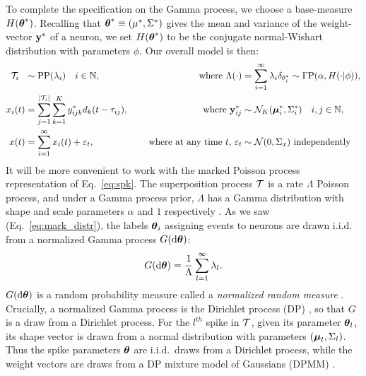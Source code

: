 To complete the specification on the Gamma process, we choose a base-measure $H(\boldsymbol{\theta}^*)$.
Recalling that $\boldsymbol{\theta}^* \equiv (\mu^*, \Sigma^*)$ gives the mean and variance of the weight-vector $\mathbf{y}^*$ of a neuron, we set $H(\boldsymbol{\theta}^*)$ 
to be the conjugate normal-Wishart distribution with parameters $\phi$. Our overall model is then:
\begin{subequations}
\begin{align}
  \mc{T}_i\ \  &\sim \text{PP}(\lambda_i) \quad i \in \NN, \quad &\text{ where } \Lambda(\cdot)&=\sum_{i=1}^{\infty} \lambda_i \delta_{\theta^*_i} \sim \Gamma \text{P}(\alpha, H(\cdot| {\phi})), \\ %
  x_i(t) &= \sum_{j = 1}^{|\mc{T}_i|}  \sum_{k = 1}^{K} y^*_{ijk} d_k(t - \tau_{ij}), \quad &\text{ where }\by^*_{ij}  &\sim \mc{N}_K(\mb{\mu}^*_i, \Sigma^*_i) \quad i,j \in \NN, \\
  x(t)   &= \sum_{i=1}^{\infty} x_i(t) + \eps_t, \quad &\text{ where at any time $t$, } \eps_t &\sim \mc{N}(0,\Sigma_x) \text{ independently}
\end{align}
\end{subequations}
% 
It will be more convenient to work with the marked Poisson process representation of Eq.~\eqref{eq:spk}. %
The superposition process $\mathcal{T}$ is a rate $\Lambda$ Poisson process,
and under a Gamma process prior, $\Lambda$ has a Gamma distribution with shape and scale parameters $\alpha$ and $1$ respectively \citep{Ferguson73}.
As we saw (Eq.~\eqref{eq:mark_distr}), the labels $\boldsymbol{\theta}_i$ assigning events to neurons are drawn i.i.d. from a normalized Gamma 
process $G(\mathrm{d} \boldsymbol{\theta})$:
\vspace{-.2in}
\begin{align}
 G(\mathrm{d} \boldsymbol{\theta}) = \frac{1}{\Lambda} \sum_{l=1}^{\infty} \lambda_l.
\end{align}
$G(\mathrm{d} \boldsymbol{\theta})$ is a random probability measure called a \emph{normalized random measure} \citep{JamesLP09}. Crucially, a 
normalized Gamma process is the Dirichlet process (DP) \citep{Ferguson73}, so that $G$ is a draw from a Dirichlet process. For the $l^{th}$ spike in $\mathcal{T}$, given its 
parameter $\boldsymbol{\theta}_l$, its shape vector is drawn from a normal distribution
with parameters $(\boldsymbol{\mu}_{l}, \Sigma_{l})$. Thus the spike parameters $\boldsymbol{\theta}$ are i.i.d.\ draws from a Dirichlet process, while the weight vectors are
draws from a DP mixture model of Gaussians (DPMM) \citep{Lo1984}.

